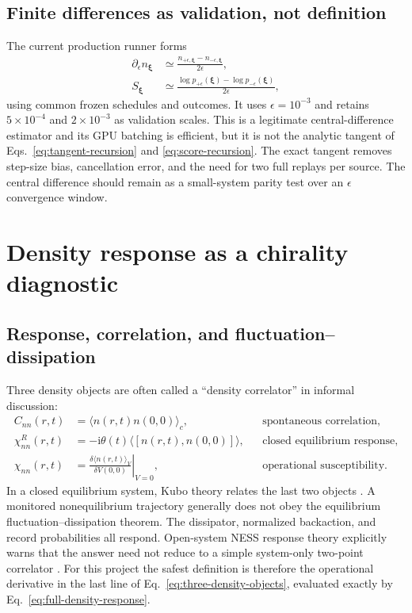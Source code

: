 \documentclass[aps,prb,onecolumn,nofootinbib,superscriptaddress]{revtex4-2}
\newcommand{\ii}{\mathrm{i}}
\newcommand{\bxi}{\bm{\xi}}
\begin{document}
\subsection{Finite differences as validation, not definition}

The current production runner forms
\begin{align}
  \partial_\epsilon n_{\bxi}
  &\simeq\frac{n_{+\epsilon,\bxi}-n_{-\epsilon,\bxi}}{2\epsilon},\nonumber\\
  S_{\bxi}
  &\simeq\frac{\log p_{+\epsilon}(\bxi)-
                  \log p_{-\epsilon}(\bxi)}{2\epsilon},
  \label{eq:current-finite-difference}
\end{align}
using common frozen schedules and outcomes.  It uses $\epsilon=10^{-3}$ and
retains $5\times10^{-4}$ and $2\times10^{-3}$ as validation scales.  This is a
legitimate central-difference estimator and its GPU batching is efficient, but
it is not the analytic tangent of Eqs.~\eqref{eq:tangent-recursion} and
\eqref{eq:score-recursion}.  The exact tangent removes step-size bias,
cancellation error, and the need for two full replays per source.  The central
difference should remain as a small-system parity test over an $\epsilon$
convergence window.

\section{Density response as a chirality diagnostic}
\label{sec:density-chirality}

\subsection{Response, correlation, and fluctuation--dissipation}

Three density objects are often called a ``density correlator'' in informal
discussion:
\begin{align}
  C_{nn}(r,t)&=\langle n(r,t)n(0,0)\rangle_c,
  &&\text{spontaneous correlation},\nonumber\\
  \chi^R_{nn}(r,t)&=-\ii\theta(t)
  \langle[n(r,t),n(0,0)]\rangle,
  &&\text{closed equilibrium response},\nonumber\\
  \chi_{nn}(r,t)&=\left.\frac{\delta\langle n(r,t)\rangle_V}
  {\delta V(0,0)}\right|_{V=0},
  &&\text{operational susceptibility}.
  \label{eq:three-density-objects}
\end{align}
In a closed equilibrium system, Kubo theory relates the last two objects
\cite{Kubo1957}.  A monitored nonequilibrium trajectory generally does not obey
the equilibrium fluctuation--dissipation theorem.  The dissipator, normalized
backaction, and record probabilities all respond.  Open-system NESS response
theory explicitly warns that the answer need not reduce to a simple
system-only two-point correlator
\cite{KonopikLutz2019,LevyRabaniLimmer2021}.  For this project the safest
definition is therefore the operational derivative in the last line of
Eq.~\eqref{eq:three-density-objects}, evaluated exactly by
Eq.~\eqref{eq:full-density-response}.
\end{document}
